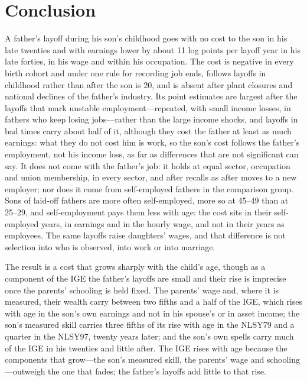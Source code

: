 \section{Conclusion}\label{sec:conclusion}

A father's layoff during his son's childhood goes with no cost to the son in his late twenties and with earnings lower
by about 11 log points per layoff year in his late forties, in his wage and within his occupation. The cost is
negative in every birth cohort and under one rule for recording job ends, follows layoffs in childhood rather than after the son is 20, and is
absent after plant closures and national declines of the father's industry. Its point estimates are largest after the layoffs that mark
unstable employment---repeated, with small income losses, in fathers who keep losing jobs---rather than the large
income shocks,
and layoffs in bad times carry about half of it, although they cost the father at least as much earnings: what they do not cost him is work, so the son's cost follows the father's employment, not his income loss, as far as differences that are not
significant can say. It does not come with the father's job: it holds at equal sector,
occupation and union membership, in every sector, and after recalls as after moves to a new employer; nor does it come
from self-employed fathers in the comparison group. Sons of laid-off fathers are more often self-employed, more so at 45--49
than at 25--29, and self-employment pays them less with age: the cost sits in their self-employed years, in earnings
and in the hourly wage, and not in their years as employees. The same layoffs raise daughters' wages, and that
difference is not selection into who is observed, into work or into marriage.

The result is a cost that grows sharply with the child's age, though as a component of the IGE the father's layoffs
are small and their rise is imprecise once the parents' schooling is held fixed. The parents'
wage and, where it is measured, their wealth carry between two fifths and a half of the IGE, which rises with age in
the son's own earnings and not in his spouse's or in asset income; the son's measured skill carries three fifths of its rise
with age in the NLSY79 and a quarter in the NLSY97, twenty years later; and the son's own spells carry much of the IGE in his twenties and little
after. The IGE rises with age because the components that grow---the son's measured skill, the parents' wage and
schooling---outweigh the one that fades; the father's layoffs add little to that rise.

